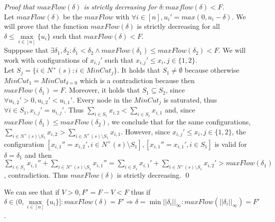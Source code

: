 \documentclass[11pt]{llncs}
\begin{document}
    \begin{proof}[Proof that $maxFlow(\delta)$ is strictly decreasing for $\delta: maxflow(\delta) < F$] \ \\
       Let $maxFlow(\delta)$ be the $maxFlow$ with $\forall i \in [n], u_i' = max(0, u_i - \delta)$.
       We will prove that the function $maxFlow(\delta)$ is strictly decreasing for all $\delta \leq \max\limits_{i \in
       [n]}\{u_i\}$ such that $maxFlow(\delta) < F$. \\
       Supppose that $\exists \delta_1, \delta_2 : \delta_1 < \delta_2 \wedge maxFlow(\delta_1) \leq maxFlow(\delta_2) < F$.
       We will work with configurations of $x_{i,j}'$ such that $x_{i,j}' \leq x_i, j \in \{1,2\}$. \\
       Let $S_j = \{i \in N^{+}(s) : i \in MinCut_j\}$. It holds that $S_1 \neq \emptyset$ because otherwise $MinCut_1 =
       MinCut_{\delta = 0}$ which is a contradiction because then $maxFlow(\delta_1) = F$. Moreover, it holds that
       $S_1 \subseteq S_2$, since $\forall u_{i,2}' > 0,u_{i,2}' < u_{i,1}'$. Every node in the $MinCut_j$ is saturated, thus
       $\forall i \in S_1, x_{i,j}' = u_{i,j}'$. Thus $\sum\limits_{i \in S_1} x_{i,2} < \sum\limits_{i \in S_1}x_{i,1}$ and,
       since $maxFlow(\delta_1) \leq maxFlow(\delta_2)$, we conclude that for the same configurations,
       $\sum\limits_{i \in N^{+}(s) \setminus S_1} x_{i,2} > \sum\limits_{i \in N^{+}(s) \setminus S_1}x_{i,1}$.
       However, since $x_{i,j}' \leq x_i, j \in \{1,2\}$, the configuration
       $[x_{i,1}'' = x_{i,2}', i \in N^{+}(s) \setminus S_1], [x_{i,1}'' = x_{i,1}', i \in S_1]$ is valid for
       $\delta = \delta_1$ and then $\sum\limits_{i \in S_1}x_{i,1}'' + \sum\limits_{i \in N^{+}(s) \setminus S_1}x_{i,1}'' =
       \sum\limits_{i \in S_1}x_{i,1}' + \sum\limits_{i \in N^{+}(s) \setminus S_1}x_{i,2}' > maxFlow(\delta_1)$,
       contradiction. Thus $maxFlow(\delta)$ is strictly decreasing. \qed
    \end{proof}
       We can see that if $V > 0, F' = F - V < F$ thus if $\delta \in (0, \max\limits_{i \in [n]}\{u_i\}]:
       maxFlow(\delta)= F' \Rightarrow \delta = \min||\delta_i||_\infty : maxFlow(||\delta_i||_\infty) = F'$.
       
\end{document}
